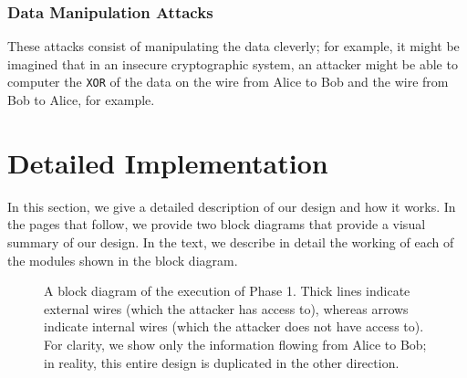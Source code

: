 \documentclass[a4paper]{report}
\begin{document}
\subsection{Data Manipulation Attacks}

These attacks consist of manipulating the data cleverly; for example, it might be imagined that in an insecure cryptographic system, an attacker might be able to computer the \verb|XOR| of the data on the wire from Alice to Bob and the wire from Bob to Alice, for example. %

\chapter{Detailed Implementation}

In this section, we give a detailed description of our design and how it works. In the pages that follow, we provide two block diagrams that provide a visual summary of our design. In the text, we describe in detail the working of each of the modules shown in the block diagram.

\begin{figure}
\label{fig3}
\centering \caption{A block diagram of the execution of Phase 1. Thick lines indicate external wires (which the attacker has access to), whereas arrows indicate internal wires (which the attacker does not have access to). For clarity, we show only the information flowing from Alice to Bob; in reality, this entire design is duplicated in the other direction.}
%
\end{figure}
\end{document}
